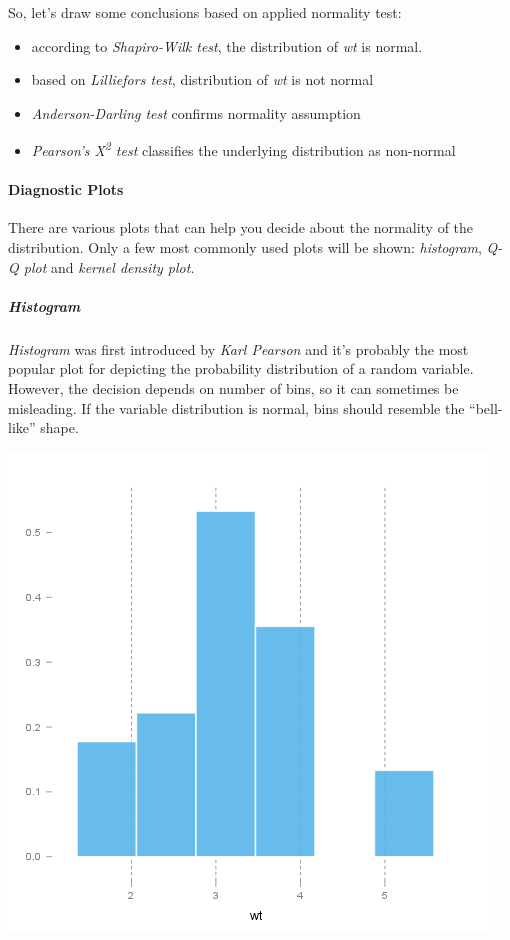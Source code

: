 \documentclass[]{article}
\makeatletter
\def\maxwidth{\ifdim\Gin@nat@width>\linewidth\linewidth
\else\Gin@nat@width\fi}
\let\Oldincludegraphics\includegraphics
\renewcommand{\includegraphics}[1]{\Oldincludegraphics[width=\maxwidth]{#1}}
\makeatother
\begin{document}
So, let's draw some conclusions based on applied normality test:

\begin{itemize}
\item
  according to \emph{Shapiro-Wilk test}, the distribution of \emph{wt}
  is normal.
\item
  based on \emph{Lilliefors test}, distribution of \emph{wt} is not
  normal
\item
  \emph{Anderson-Darling test} confirms normality assumption
\item
  \emph{Pearson's Χ\textsuperscript{2} test} classifies the underlying
  distribution as non-normal
\end{itemize}
\paragraph{Diagnostic Plots}

There are various plots that can help you decide about the normality of
the distribution. Only a few most commonly used plots will be shown:
\emph{histogram}, \emph{Q-Q plot} and \emph{kernel density plot}.

\subparagraph{Histogram}

\emph{Histogram} was first introduced by \emph{Karl Pearson} and it's
probably the most popular plot for depicting the probability
distribution of a random variable. However, the decision depends on
number of bins, so it can sometimes be misleading. If the variable
distribution is normal, bins should resemble the ``bell-like'' shape.

\href{bf47295875cfa6d1667455a7d2721b19-hires.png}{\includegraphics{bf47295875cfa6d1667455a7d2721b19.png}}
\end{document}
